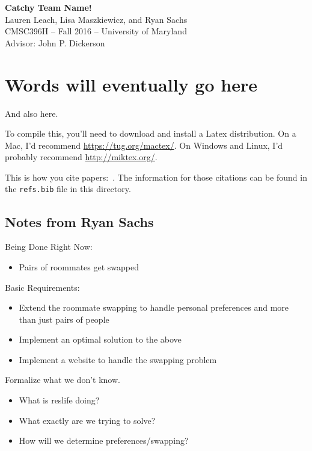 \documentclass[12pt]{article}
\begin{document}
\begin{center}
{\Large \textbf{Catchy Team Name!}}\\
Lauren Leach, Lisa Maszkiewicz, and Ryan Sachs\\
CMSC396H -- Fall 2016 -- University of Maryland\\
Advisor: John P. Dickerson
\end{center}

\section*{Words will eventually go here}
And also here.

To compile this, you'll need to download and install a Latex distribution.  On a Mac, I'd recommend \url{https://tug.org/mactex/}.  On Windows and Linux, I'd probably recommend \url{http://miktex.org/}.

This is how you cite papers:~\cite{Jevons85:Money}.  The information for those citations can be found in the \texttt{refs.bib} file in this directory.

\subsection*{Notes from Ryan Sachs}

Being Done Right Now:
\begin{itemize}
\item Pairs of roommates get swapped
\end{itemize}

Basic Requirements:
\begin{itemize}
\item Extend the roommate swapping to handle personal preferences and more than just pairs of people
\item Implement an optimal solution to the above
\item Implement a website to handle the swapping problem
\end{itemize}

Formalize what we don't know.
\begin{itemize}
\item What is reslife doing?
\item What exactly are we trying to solve?
\item How will we determine preferences/swapping?
\end{itemize}



\end{document}

